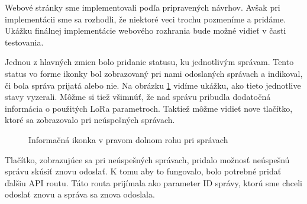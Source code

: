 \documentclass[slovak,master]{diploma}
\begin{document}
Webové stránky sme implementovali podľa pripravených návrhov. Avšak pri implementácii sme sa rozhodli, že 
niektoré veci trochu pozmeníme a pridáme. Ukážku finálnej implementácie webového rozhrania bude možné vidieť v časti testovania.

Jednou z hlavných zmien bolo pridanie statusu, ku jednotlivým správam. 
Tento status vo forme ikonky bol zobrazovaný pri nami odoslaných správach a indikoval, či bola správa prijatá alebo nie. 
Na obrázku \ref{fig:messageStates} vidíme ukážku, ako tieto jednotlive stavy vyzerali. Môžme si tiež všimnúť, že nad správu 
pribudla dodatočná informácia o použitých LoRa parametroch. Taktiež môžme vidieť nove tlačítko, ktoré sa zobrazovalo pri 
neúspešných správach.

\begin{figure}[h!]
  \centering
  \newline
  \caption{Informačná ikonka v pravom dolnom rohu pri správach}
  \label{fig:messageStates}
\end{figure}

Tlačítko, zobrazujúce sa pri neúspešných správach, pridalo možnosť neúspešnú správu skúsiť znovu odoslať. K tomu aby to fungovalo, 
bolo potrebné pridať ďalšiu API routu. Táto routa prijímala ako parameter ID správy, ktorú sme chceli odoslať znovu a správa sa znova odoslala.
\end{document}
